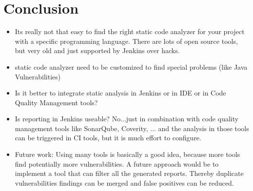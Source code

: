 \documentclass[conference]{IEEEtran}
\begin{document}
\section{Conclusion}
\label{sec:conclusion}
\begin{itemize}
	\item Its really not that easy to find the right static code analyzer for your project with a specific programming language. There are lots of open source tools, but very old and just supported by Jenkins over hacks.
	\item static code analyzer need to be customized to find special problems (like Java Vulnerabilities)
	\item Is it better to integrate static analysis in Jenkins or in IDE or in Code Quality Management tools?
	\item Is reporting in Jenkins useable? No...just in combination with code quality management tools like SonarQube, Coverity, ... and the analysis in those tools can be triggered in CI tools, but it is much effort to configure.
	\item Future work: Using many tools is basically a good idea, because more tools find potentially more vulnerabilities. A future approach would be to implement a tool that can filter all the generated reports. Thereby duplicate vulnerabilities findings can be merged and false positives can be reduced.
\end{itemize}





\end{document}
